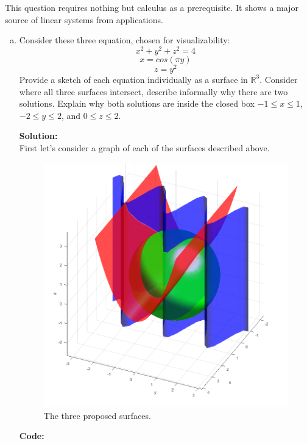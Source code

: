 \documentclass[12pt]{article}
\makeatletter
\theoremstyle{homework}
\newenvironment{exercise}[1]
{\def\@currentlabel{#1}\exercisecore}
{\endexercisecore}
\newcommand{\localhead}[1]{\par\smallskip\noindent\textbf{#1}\nobreak\\}%
\newcommand\solution{\localhead{Solution:}}
\newcommand{\Reals}{\ensuremath{\mathbb R}}
\let\RR\Reals
\makeatother
\begin{document}
\begin{exercise}{P5} This question requires nothing but calculus as a prerequisite. It shows a major source of linear systems from applications.
  \begin{enumerate}[a.]
    \item Consider these three equation, chosen for visualizability:
          \begin{equation*}
            x^2 + y^2 + z^2 = 4
          \end{equation*}
          \begin{equation*}
            x = cos(\pi y)
          \end{equation*}
          \begin{equation*}
            z = y^2
          \end{equation*}
          Provide a sketch of each equation individually as a surface in $\RR^3$. Consider where all three surfaces intersect, describe
          informally why there are two solutions. Explain why both solutions are inside the closed box $-1\leq x \leq 1$, $-2\leq y \leq 2$, and $0\leq z \leq 2$.\\
          \solution First let's consider a graph of each of the surfaces described above.
          \begin{figure}[H]
            \begin{center}
              \caption{The three proposed surfaces.}
              \includegraphics[width=.75\textwidth]{figure1.png}
            \end{center}
          \end{figure}
          \textbf{Code:}

\end{enumerate}
\end{exercise}
\end{document}
